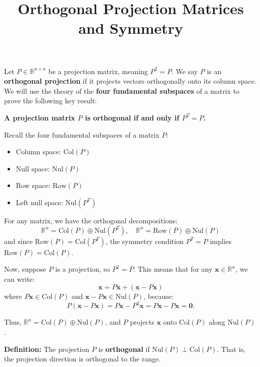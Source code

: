 \documentclass{article}
\title{Orthogonal Projection Matrices and Symmetry}
\author{}
\date{}
\begin{document}
\maketitle

\Large

Let $ P \in \mathbb{R}^{n \times n} $ be a projection matrix, meaning $ P^2 = P $. We say $ P $ is an \textbf{orthogonal projection} if it projects vectors orthogonally onto its column space. We will use the theory of the \textbf{four fundamental subspaces} of a matrix to prove the following key result:

\begin{center}
    \textbf{A projection matrix $ P $ is orthogonal if and only if $ P^T = P $.}
\end{center}

Recall the four fundamental subspaces of a matrix $ P $:
\begin{itemize}
\item Column space: $ \mathrm{Col}(P) $
    \item Null space: $ \mathrm{Nul}(P) $
    \item Row space: $ \mathrm{Row}(P) $
    \item Left null space: $ \mathrm{Nul}(P^T) $
\end{itemize}

For any matrix, we have the orthogonal decompositions:
\[
\mathbb{R}^n = \mathrm{Col}(P) \oplus \mathrm{Nul}(P^T), \quad 
\mathbb{R}^n = \mathrm{Row}(P) \oplus \mathrm{Nul}(P)
\]
and since $ \mathrm{Row}(P) = \mathrm{Col}(P^T) $, the symmetry condition $ P^T = P $ implies $ \mathrm{Row}(P) = \mathrm{Col}(P) $.

Now, suppose $ P $ is a projection, so $ P^2 = P $. This means that for any $ \mathbf{x} \in \mathbb{R}^n $, we can write:
\[
\mathbf{x} = P\mathbf{x} + (\mathbf{x} - P\mathbf{x})
\]
where $ P\mathbf{x} \in \mathrm{Col}(P) $ and $ \mathbf{x} - P\mathbf{x} \in \mathrm{Nul}(P) $, because:
\[
P(\mathbf{x} - P\mathbf{x}) = P\mathbf{x} - P^2\mathbf{x} = P\mathbf{x} - P\mathbf{x} = \mathbf{0}.
\]

Thus, $ \mathbb{R}^n = \mathrm{Col}(P) \oplus \mathrm{Nul}(P) $, and $ P $ projects $ \mathbf{x} $ onto $ \mathrm{Col}(P) $ along $ \mathrm{Nul}(P) $.

\bigskip

\noindent \textbf{Definition:} The projection $ P $ is \textbf{orthogonal} if $ \mathrm{Nul}(P) \perp \mathrm{Col}(P) $. That is, the projection direction is orthogonal to the range.
\end{document}
